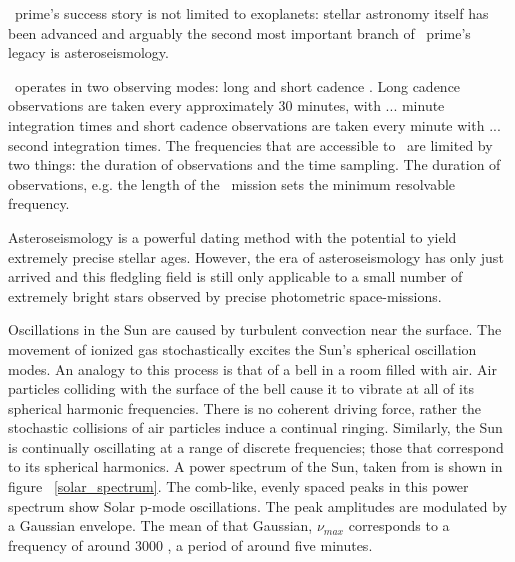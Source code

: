 \kepler\ prime's success story is not limited to exoplanets: stellar astronomy
itself has been advanced and arguably the second most important branch of
\kepler\ prime's legacy is asteroseismology.

\kepler\ operates in two observing modes: long and short cadence
\citep[][]{smith2012, stumpe2012}.
Long cadence observations are taken every approximately 30 minutes, with ...
minute integration times and short cadence observations are taken every minute
with ... second integration times.
The frequencies that are accessible to \kepler\ are limited by two things: the
duration of observations and the time sampling.
The duration of observations, e.g. the length of the \kepler\ mission sets the
minimum resolvable frequency.


Asteroseismology is a powerful dating method with the potential to yield
extremely precise stellar ages.
However, the era of asteroseismology has only just arrived and this fledgling
field is still only applicable to a small number of extremely bright stars
observed by precise photometric space-missions.

Oscillations in the Sun are caused by turbulent convection near the surface.
The movement of ionized gas stochastically excites the Sun's spherical
oscillation modes.
An analogy to this process is that of a bell in a room filled with air.
Air particles colliding with the surface of the bell cause it to vibrate at
all of its spherical harmonic frequencies.
There is no coherent driving force, rather the stochastic collisions of air
particles induce a continual ringing.
Similarly, the Sun is continually oscillating at a range of discrete
frequencies; those that correspond to its spherical harmonics.
A power spectrum of the Sun, taken from \citet{brown} is shown in figure
~\ref{solar_spectrum}.
The comb-like, evenly spaced peaks in this power spectrum show Solar p-mode
oscillations.
The peak amplitudes are modulated by a Gaussian envelope.
The mean of that Gaussian, $\nu_{max}$ corresponds to a frequency of around
3000 \uHz, a period of around five minutes.

